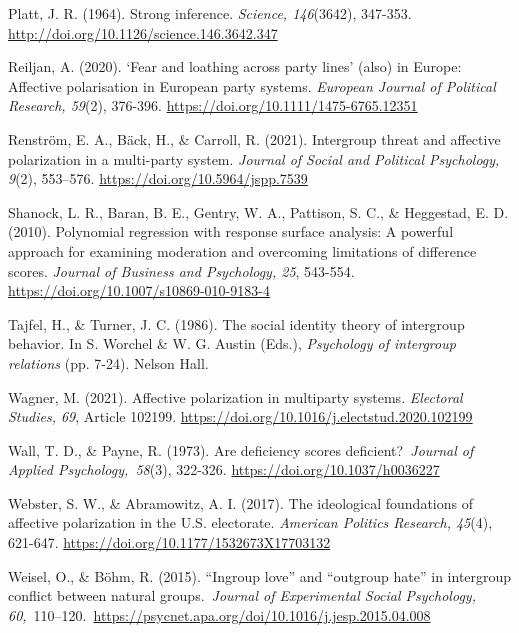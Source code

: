 \documentclass[authordate, meta]{jote-new-article}
\begin{document}
	Platt, J. R. (1964). Strong inference. \emph{Science, 146}(3642), 347-353. \url{http://doi.org/10.1126/science.146.3642.347}



	Reiljan, A. (2020). ‘Fear and loathing across party lines' (also) in Europe: Affective polarisation in European party systems. \emph{European Journal of Political Research, 59}(2), 376-396. \url{https://doi.org/10.1111/1475-6765.12351}



	Renström, E. A., Bäck, H., \& Carroll, R. (2021). Intergroup threat and affective polarization in a multi-party system. \emph{Journal of Social and Political Psychology, 9}(2), 553--576. \url{https://doi.org/10.5964/jspp.7539}



	Shanock, L. R., Baran, B. E., Gentry, W. A., Pattison, S. C., \& Heggestad, E. D. (2010). Polynomial regression with response surface analysis: A powerful approach for examining moderation and overcoming limitations of difference scores. \emph{Journal of Business and Psychology, 25}, 543-554. \url{https://doi.org/10.1007/s10869-010-9183-4}



	Tajfel, H., \& Turner, J. C. (1986). The social identity theory of intergroup behavior. In S. Worchel \& W. G. Austin (Eds.), \emph{Psychology of intergroup relations} (pp. 7-24). Nelson Hall.



	Wagner, M. (2021). Affective polarization in multiparty systems. \emph{Electoral Studies, 69}, Article 102199. \url{https://doi.org/10.1016/j.electstud.2020.102199}



	Wall, T. D., \& Payne, R. (1973). Are deficiency scores deficient?\emph{ Journal of Applied Psychology, 58}(3), 322-326. \url{https://doi.org/10.1037/h0036227}



	Webster, S. W., \& Abramowitz, A. I. (2017). The ideological foundations of affective polarization in the U.S. electorate. \emph{American Politics Research, 45}(4), 621-647. \url{https://doi.org/10.1177/1532673X17703132}



	Weisel, O., \& Böhm, R. (2015). “Ingroup love” and “outgroup hate” in intergroup conflict between natural groups. \emph{Journal of Experimental Social Psychology, 60,} 110--120. \url{https://psycnet.apa.org/doi/10.1016/j.jesp.2015.04.008}
\end{document}
